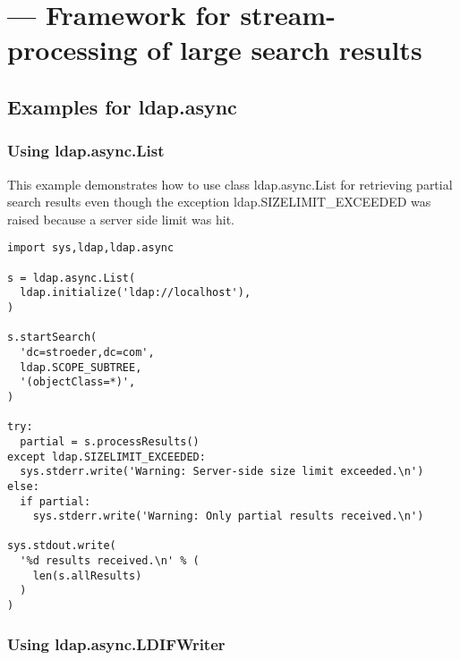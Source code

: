 
\section{ ---
  Framework for stream-processing of large search results }




\subsection{Examples for ldap.async \label{ldap.async-example}}

\subsubsection{Using ldap.async.List \label{ldap.async-example.List}}

This example demonstrates how to use class ldap.async.List for
retrieving partial search results even though the exception
ldap.SIZELIMIT_EXCEEDED was raised because a server side limit was hit.

\begin{verbatim}
import sys,ldap,ldap.async

s = ldap.async.List(
  ldap.initialize('ldap://localhost'),
)

s.startSearch(
  'dc=stroeder,dc=com',
  ldap.SCOPE_SUBTREE,
  '(objectClass=*)',
)

try:
  partial = s.processResults()
except ldap.SIZELIMIT_EXCEEDED:
  sys.stderr.write('Warning: Server-side size limit exceeded.\n')
else:
  if partial:
    sys.stderr.write('Warning: Only partial results received.\n')

sys.stdout.write(
  '%d results received.\n' % (
    len(s.allResults)
  )
)
\end{verbatim}

\subsubsection{Using ldap.async.LDIFWriter \label{ldap.async-example.LDIFWriter}}

